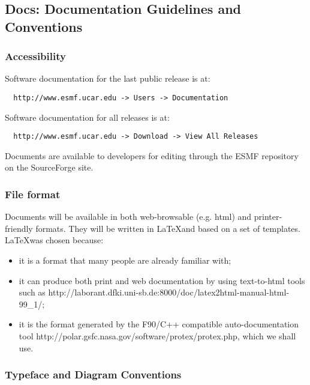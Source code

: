 \subsection{Docs: Documentation Guidelines and Conventions}
\label{sec:docguidelines}

\subsubsection{Accessibility}

Software documentation for the last public release is at:
\begin{verbatim}
  http://www.esmf.ucar.edu -> Users -> Documentation
\end{verbatim} 

Software documentation for all releases is at:
\begin{verbatim}
  http://www.esmf.ucar.edu -> Download -> View All Releases
\end{verbatim}

Documents are available to developers for editing through the
ESMF repository on the SourceForge site.

\subsubsection{File format}

Documents will be available in both web-browsable (e.g. html) and
printer-friendly formats.  They will be written in \LaTeX and based on a
set of templates. \LaTeX was chosen because:

\begin{itemize}
\item it is a format that many people are already familiar with; 
\item it can produce both print and web documentation by using text-to-html
tools such as  
{http://laborant.dfki.uni-sb.de:8000/doc/latex2html-manual-html-99\_1/};
\item it is the format generated by the F90/C++ compatible 
auto-documentation tool 
{http://polar.gsfc.nasa.gov/software/protex/protex.php}\cite{protex}, 
which we shall use.
\end{itemize}

\subsubsection{Typeface and Diagram Conventions}

